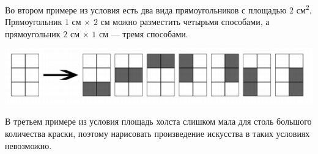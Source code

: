 \begin{problem}
Во втором примере из условия есть два вида прямоугольников с площадью $2$ см\textsuperscript{2}. Прямоугольник $1$ см $\times$ $2$ см  можно разместить четырьмя способами, а прямоугольник $2$ см $\times$ $1$ см  — тремя способами.

\begin{center}
\begin{adjustbox}{max size={\textwidth}{\textheight}}
\includegraphics{images/2965.png}
\end{adjustbox}
\end{center}

В третьем примере из условия площадь холста слишком мала для столь большого количества краски, поэтому нарисовать произведение искусства в таких условиях невозможно.

\end{problem}